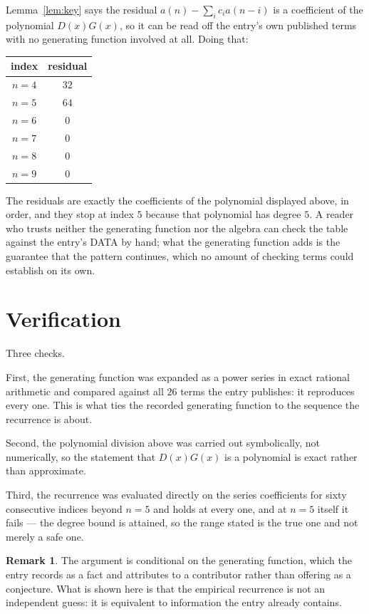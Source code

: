 \documentclass[11pt,a4paper]{article}
\theoremstyle{plain}
\theoremstyle{definition}
\newtheorem{remark}[theorem]{Remark}
\begin{document}
Lemma~\ref{lem:key} says the residual $a(n)-\sum_ic_ia(n-i)$ is a coefficient of the
polynomial $D(x)G(x)$, so it can be read off the entry's own published terms with no
generating function involved at all. Doing that:
\begin{center}
\begin{tabular}{cc}
index & residual \\ \hline
$n=4$ & $32$ \\
$n=5$ & $64$ \\
$n=6$ & $0$ \\
$n=7$ & $0$ \\
$n=8$ & $0$ \\
$n=9$ & $0$
\end{tabular}
\end{center}
The residuals are exactly the coefficients of the polynomial displayed above, in order, and
they stop at index $5$ because that polynomial has degree $5$. A reader who trusts
neither the generating function nor the algebra can check the table against the entry's DATA
by hand; what the generating function adds is the guarantee that the pattern continues, which
no amount of checking terms could establish on its own.

\section{Verification}

Three checks.

First, the generating function was expanded as a power series in exact rational arithmetic and
compared against all $26$ terms the entry publishes: it reproduces every one. This is
what ties the recorded generating function to the sequence the recurrence is about.

Second, the polynomial division above was carried out symbolically, not numerically, so the
statement that $D(x)G(x)$ is a polynomial is exact rather than approximate.

Third, the recurrence was evaluated directly on the series coefficients for sixty consecutive
indices beyond $n=5$ and holds at every one, and at $n=5$ itself it fails --- the
degree bound is attained, so the range stated is the true one and not merely a safe one.

\begin{remark}
The argument is conditional on the generating function, which the entry records as a fact and
attributes to a contributor rather than offering as a conjecture. What is shown here is that
the empirical recurrence is not an independent guess: it is equivalent to information the
entry already contains.
\end{remark}
\end{document}
